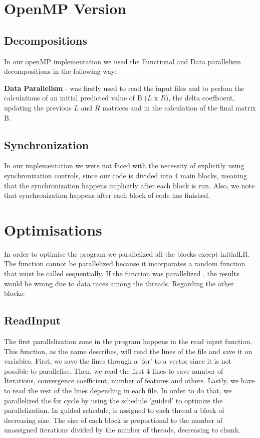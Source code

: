 \documentclass[twocolumn]{article}
\begin{document}
    \section{OpenMP Version}\label{sec:openmp-version}

    \subsection{Decompositions}
    \label{subsec:decompostions}
    In our openMP implementation we used the Functional and Data parallelism decompositions in the following way:

    \textbf{Data Parallelism} - was firstly used to read the input files and to perfom the calculations of an initial predicted value of B ($L$ x $R$), the delta coefficient, updating the previous $L$ and $R$ matrices and in the calculation of the final matrix B\@.

    \subsection{Synchronization}
    \label{subsec:synchronization}
    In our implementation we were not faced with the necessity of explicitly using synchronization controls, since our code is divided into 4 main blocks, meaning that the synchronization happens implicitly after each block is run.
    Also, we note that synchronization happens after each block of code has finished.


    \section{Optimisations} \label{sec:optimisations}

    In order to optimise the program we parallelized all the blocks except initialLR. The function cannot be parallelized because it incorporates a random function that must be called sequentially.
    If the function was parallelized , the results would be wrong due to data races among the threads.
    Regarding the other blocks:

    \subsection{ReadInput}\label{subsec:readinput2}
    The first parallelization zone in the program happens in the read input function.
    This function, as the name describes, will read the lines of the file and save it on variables.
    First, we save the lines through a 'for' to a vector since it is not possible to parallelise.
    Then, we read the first 4 lines to save number of Iterations, convergence coefficient, number of features and others.
    Lastly, we have to read the rest of the lines depending in each file.
    In order to do that, we parallelized the for cycle by using the schedule 'guided' to optimize the parallelization.
    In guided schedule, is assigned to each thread a block of decreasing size.
    The size of each block is proportional to the number of unassigned iterations divided by the number of threads, decreasing to chunk.
\end{document}
